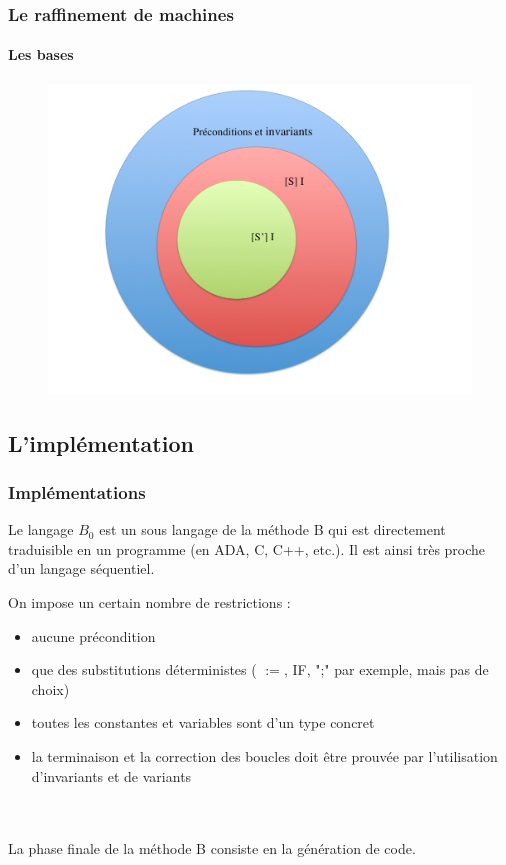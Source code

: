 \documentclass[11pt,a4paper,xcolor=table]{beamer} %
\begin{document}
\begin{frame}
\frametitle{Le raffinement de machines}
\framesubtitle{Les bases}
\begin{figure}[h]
\centering
\includegraphics[scale=0.25]{ressources/cond.png}
\end{figure}
\end{frame}

\subsection{L'implémentation}
\begin{frame}
\frametitle{Implémentations}
Le langage $B_0$ est un sous langage de la méthode B qui est directement traduisible en un programme (en ADA, C, C++, etc.).  Il est ainsi très proche d'un langage séquentiel.

\pause

On impose un certain nombre de restrictions :
\begin{itemize}
\item aucune précondition
\pause
\item que des substitutions déterministes ( $:=$, \textsc{IF}, ";" par exemple, mais pas de choix)
\pause
\item toutes les constantes et variables sont d'un type concret
\pause
\item la terminaison et la correction des boucles doit être prouvée par l'utilisation d'invariants et de variants
\end{itemize}
~\\~\\\pause
La phase finale de la méthode B consiste en la génération de code.

\end{frame}
\end{document}
